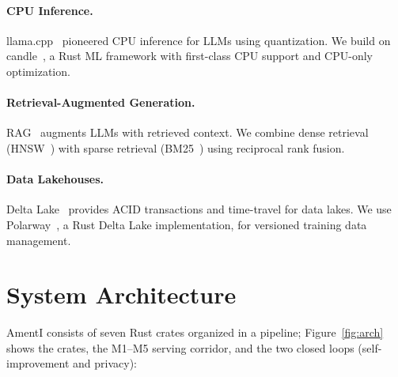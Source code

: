 \documentclass[11pt,a4paper]{article}
\theoremstyle{plain}
\theoremstyle{definition}
\begin{document}
\paragraph{CPU Inference.}
llama.cpp~\cite{llamacpp} pioneered CPU inference for LLMs using quantization.
We build on candle~\cite{candle}, a Rust ML framework with first-class CPU
support and CPU-only optimization.

\paragraph{Retrieval-Augmented Generation.}
RAG~\cite{lewis2020rag} augments LLMs with retrieved context. We combine dense
retrieval (HNSW~\cite{malkov2018hnsw}) with sparse retrieval (BM25~\cite{robertson2009bm25})
using reciprocal rank fusion.

\paragraph{Data Lakehouses.}
Delta Lake~\cite{armbrust2020delta} provides ACID transactions and time-travel
for data lakes. We use Polarway~\cite{alvarez2026polarway}, a Rust Delta Lake
implementation, for versioned training data management.

\section{System Architecture}
\label{sec:architecture}

AmentI consists of seven Rust crates organized in a pipeline;
Figure~\ref{fig:arch} shows the crates, the M1--M5 serving corridor, and the
two closed loops (self-improvement and privacy):
\end{document}
